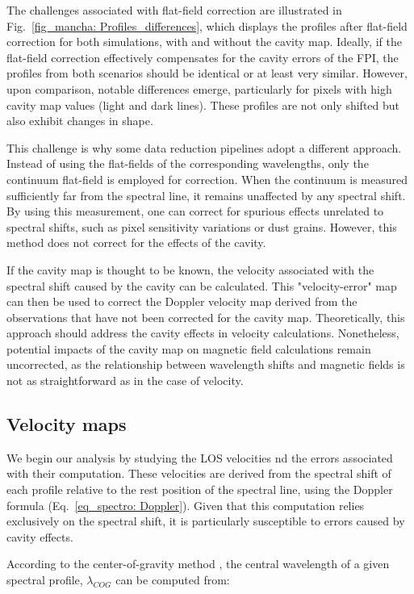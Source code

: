 The challenges associated with flat-field correction are illustrated in Fig.~\ref{fig_mancha: Profiles_differences}, which displays the profiles after flat-field correction for both simulations, with and without the cavity map. Ideally, if the flat-field correction effectively compensates for the cavity errors of the FPI, the profiles from both scenarios should be identical or at least very similar. However, upon comparison, notable differences emerge, particularly for pixels with high cavity map values (light and dark lines). These profiles are not only shifted but also exhibit changes in shape. 

This challenge is why some data reduction pipelines adopt a different approach. Instead of using the flat-fields of the corresponding wavelengths, only the continuum flat-field is employed for correction. When the continuum is measured sufficiently far from the spectral line, it remains unaffected by any spectral shift. By using this measurement, one can correct for spurious effects unrelated to spectral shifts, such as pixel sensitivity variations or dust grains. However, this method does not correct for the effects of the cavity.

If the cavity map is thought to be known, the velocity associated with the spectral shift caused by the cavity can be calculated. This "velocity-error" map can then be used to correct the Doppler velocity map derived from the observations that have not been corrected for the cavity map. Theoretically, this approach should address the cavity effects in velocity calculations. Nonetheless, potential impacts of the cavity map on magnetic field calculations remain uncorrected, as the relationship between wavelength shifts and magnetic fields is not as straightforward as in the case of velocity.

\subsection{Velocity maps}

We begin our analysis by studying the LOS velocities nd the errors associated with their computation. These velocities are derived from the spectral shift of each profile relative to the rest position of the spectral line, using the Doppler formula (Eq.~\eqref{eq_spectro: Doppler}). Given that this computation relies exclusively on the spectral shift, it is particularly susceptible to errors caused by cavity effects.

According to the center-of-gravity method \citep{center_of_gravity}, the central wavelength of a given spectral profile, $\lambda _ {COG}$ can be computed from:

